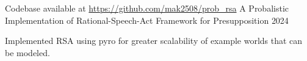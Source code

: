 \begin{cventries}
\cventry
{Codebase available at \url{https://github.com/mak2508/prob_rsa}} %
{A Probalistic Implementation of Rational-Speech-Act Framework for Presupposition} %
{} %
{2024} %
{
  \begin{cvitems} %
    \item {Implemented RSA using pyro for greater scalability of example worlds that can be modeled.}
  \end{cvitems}
}

\end{cventries}
